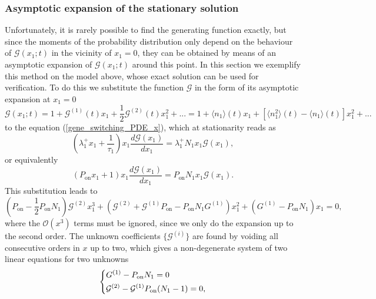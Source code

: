 \documentclass[a4paper, 11pt]{article}
\begin{document}
\subsubsection{Asymptotic expansion of the stationary solution} \label{switching_asymptotic_expansion}
Unfortunately, it is rarely possible to find the generating function exactly, but since the moments of the probability distribution only depend on the behaviour of $\mathcal G(x_1;t)$ in the vicinity of $x_1=0$, they can be obtained by means of an asymptotic expansion of $\mathcal G(x_1;t)$ around this point. In this section we exemplify this method on the model above, whose exact solution can be used for verification. To do this we substitute the function $\mathcal G$ in the form of its asymptotic expansion at $x_1=0$
\begin{equation}\label{two_compartment_hopping_expansion}
  \mathcal G(x_1;t) = 1 + \mathcal G^{(1)}(t)x_1 + \frac{1}{2}\mathcal G^{(2)}(t) x_1^2 + ... = 1 + \langle n_1\rangle(t) x_1 + \left[\langle n_1^2 \rangle(t)-\langle n_1\rangle(t)\right]x_1^2 + ...
\end{equation}
to the equation (\ref{gene_switching_PDE_x}), which at stationarity reads as
\begin{equation*}
  (\lambda_1^+x_1 + \frac{1}{\tau_1})x_1\frac{d\mathcal G(x_1)}{dx_1} = \lambda_1^+N_1x_1\mathcal G(x_1),
\end{equation*}
or equivalently
\begin{equation*}
  (P_{\text{on}}x_1 + 1)x_1\frac{d\mathcal G(x_1)}{dx_1} = P_{\text{on}}N_1x_1\mathcal G(x_1).
\end{equation*}
This substitution leads to
\begin{equation*}
  \left(P_{\text{on}}-\frac{1}{2}P_{\text{on}}N_1\right)\mathcal G^{(2)}x_1^3 + \left(\mathcal G^{(2)} + \mathcal G^{(1)}P_{\text{on}} - P_{\text{on}}N_1G^{(1)}\right)x_1^2 + \left(G^{(1)}-P_{\text{on}}N_1\right)x_1 = 0,
\end{equation*}
where the $\mathcal O(x^3)$ terms must be ignored, since we only do the expansion up to the second order. The unknown coefficients $\{\mathcal G^{(i)}\}$ are found by voiding all consecutive orders in $x$ up to two, which gives a non-degenerate system of two linear equations for two unknowns
\begin{equation*}
  \begin{dcases}
    G^{(1)}-P_{\text{on}}N_1 = 0\\
    \mathcal G^{(2)} - \mathcal G^{(1)}P_{\text{on}}(N_1-1) = 0,
  \end{dcases}
\end{equation*}
\end{document}
